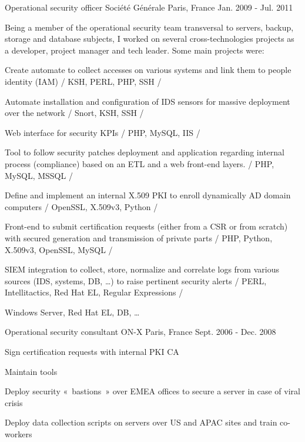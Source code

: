 \begin{cventries}
    \cventry
    {Operational security officer} %
    {Société Générale} %
    {Paris, France} %
    {Jan. 2009 - Jul. 2011} %
    { %
    Being a member of the operational security team transversal to servers, backup, storage and database subjects, I worked on several cross-technologies projects as a developer, project manager and tech leader. \hfill\break
    Some main projects were: \hfill\break
        \begin{cvitems}
            \item {Create automate to collect accesses on various systems and link them to people identity (IAM) / KSH, PERL, PHP, SSH /}
            \item {Automate installation and configuration of IDS sensors for massive deployment over the network / Snort, KSH, SSH /}
            \item {Web interface for security KPIs / PHP, MySQL, IIS /}
            \item {Tool to follow security patches deployment and application regarding internal process (compliance) based on an ETL and a web front-end layers. / PHP, MySQL, MSSQL /}
            \item {Define and implement an internal X.509 PKI to enroll dynamically AD domain computers / OpenSSL, X.509v3, Python /}
            \item {Front-end to submit certification requests (either from a CSR or from scratch) with secured generation and transmission of private parts / PHP, Python, X.509v3, OpenSSL, MySQL /}
            \item {SIEM integration to collect, store, normalize and correlate logs from various sources (IDS, systems, DB, …) to raise pertinent security alerts / PERL, Intellitactics, Red Hat EL, Regular Expressions /}
        \end{cvitems} \hfill\break
        \begin{cvskills}
             {Windows Server, Red Hat EL, DB, …}
        \end{cvskills}
    }

    \cventry
    {Operational security consultant} %
    {ON-X} %
    {Paris, France} %
    {Sept. 2006 - Dec. 2008} %
    { %
        \begin{cvitems}
            \item {Sign certification requests with internal PKI CA}
            \item {Maintain tools}
            \item {Deploy security « bastions » over EMEA offices to secure a server in case of viral crisis}
            \item {Deploy data collection scripts on servers over US and APAC sites and train co-workers}
        \end{cvitems}
    }


\end{cventries}
